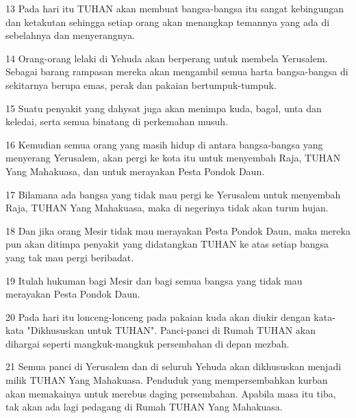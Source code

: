 \par 13 Pada hari itu TUHAN akan membuat bangsa-bangsa itu sangat kebingungan dan ketakutan sehingga setiap orang akan menangkap temannya yang ada di sebelahnya dan menyerangnya.
\par 14 Orang-orang lelaki di Yehuda akan berperang untuk membela Yerusalem. Sebagai barang rampasan mereka akan mengambil semua harta bangsa-bangsa di sekitarnya berupa emas, perak dan pakaian bertumpuk-tumpuk.
\par 15 Suatu penyakit yang dahysat juga akan menimpa kuda, bagal, unta dan keledai, serta semua binatang di perkemahan musuh.
\par 16 Kemudian semua orang yang masih hidup di antara bangsa-bangsa yang menyerang Yerusalem, akan pergi ke kota itu untuk menyembah Raja, TUHAN Yang Mahakuasa, dan untuk merayakan Pesta Pondok Daun.
\par 17 Bilamana ada bangsa yang tidak mau pergi ke Yerusalem untuk menyembah Raja, TUHAN Yang Mahakuasa, maka di negerinya tidak akan turun hujan.
\par 18 Dan jika orang Mesir tidak mau merayakan Pesta Pondok Daun, maka mereka pun akan ditimpa penyakit yang didatangkan TUHAN ke atas setiap bangsa yang tak mau pergi beribadat.
\par 19 Itulah hukuman bagi Mesir dan bagi semua bangsa yang tidak mau merayakan Pesta Pondok Daun.
\par 20 Pada hari itu lonceng-lonceng pada pakaian kuda akan diukir dengan kata-kata "Dikhususkan untuk TUHAN". Panci-panci di Rumah TUHAN akan dihargai seperti mangkuk-mangkuk persembahan di depan mezbah.
\par 21 Semua panci di Yerusalem dan di seluruh Yehuda akan dikhususkan menjadi milik TUHAN Yang Mahakuasa. Penduduk yang mempersembahkan kurban akan memakainya untuk merebus daging persembahan. Apabila masa itu tiba, tak akan ada lagi pedagang di Rumah TUHAN Yang Mahakuasa.


